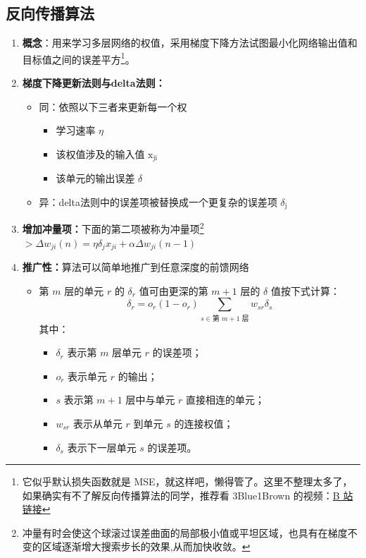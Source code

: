 \documentclass[../main.tex]{subfiles}
\begin{document}
\subsection{反向传播算法}\label{sec:backprop}
\begin{enumerate}
    \item \textbf{概念}：用来学习多层网络的权值，采用梯度下降方法试图最小化网络输出值和目标值之间的误差平方\footnote{它似乎默认损失函数就是 MSE，就这样吧，懒得管了。这里不整理太多了，如果确实有不了解反向传播算法的同学，推荐看 3Blue1Brown 的视频：\href{https://www.bilibili.com/video/BV16x411V7Qg/?spm_id_from=333.337.search-card.all.click&vd_source=5deca47094767260f853b759a625a68f}{B 站链接}}。
    \item \textbf{梯度下降更新法则与delta法则：}
    \begin{itemize}
        \item 同：依照以下三者来更新每一个权
        \begin{itemize}
            \item 学习速率 $\eta$
            \item 该权值涉及的输入值 ${\mathrm{x}}_{\mathrm{{ji}}}$
            \item 该单元的输出误差 $\delta$
        \end{itemize}
        \item 异：delta法则中的误差项被替换成一个更复杂的误差项 ${\delta }_{\mathrm{j}}$
    \end{itemize}
    \item \textbf{增加冲量项：}下面的第二项被称为冲量项\footnote{冲量有时会使这个球滚过误差曲面的局部极小值或平坦区域，也具有在梯度不变的区域逐渐增大搜索步长的效果,从而加快收敛。}
    $> \Delta {w}_{ji}\left( n\right)  = \eta {\delta }_{j}{x}_{ji} + {\alpha \Delta }{w}_{ji}\left( {n - 1}\right)$
    \item \textbf{推广性：}算法可以简单地推广到任意深度的前馈网络
    {\small\kaishu
    \begin{itemize}
     \item 第 $m$ 层的单元 $r$ 的 $\delta_r$ 值可由更深的第 $m+1$ 层的 $\delta$ 值按下式计算：
        \[
            \delta_r = o_r(1-o_r)\sum_{s\in \text{第 }m+1\text{ 层}} w_{sr}\delta_s
        \]
        其中：
        \begin{itemize}
            \item $\delta_r$ 表示第 $m$ 层单元 $r$ 的误差项；
            \item $o_r$ 表示单元 $r$ 的输出；
            \item $s$ 表示第 $m+1$ 层中与单元 $r$ 直接相连的单元；
            \item $w_{sr}$ 表示从单元 $r$ 到单元 $s$ 的连接权值；
            \item $\delta_s$ 表示下一层单元 $s$ 的误差项。
        \end{itemize}
    \end{itemize}
    }
\end{enumerate}
\end{document}
